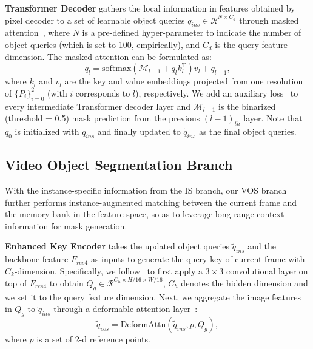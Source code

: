 \documentclass[10pt,twocolumn,letterpaper]{article}
\begin{document}
\vspace{0.02in}
\noindent \textbf{Transformer Decoder} gathers the local information in features obtained by pixel decoder to a set of learnable object queries $q_{ins} \in \mathcal{R}^{N \times C_{d}}$ through masked attention~\cite{cheng2022masked}, where $N$ is a pre-defined hyper-parameter to indicate the number of object queries (which is set to 100, empirically), and $C_{d}$ is the query feature dimension. The masked attention can be formulated as:
\begin{equation}
    q_{l} = \mathrm{softmax}(\mathcal{M}_{l-1} + q_{l}k_{l}^{\mathrm{T}})v_{l} + q_{l-1},
\end{equation}
where $k_{l}$ and $v_{l}$ are the key and value embeddings projected from one resolution of $\{P_{i}\}_{i=0}^{2}$ (with $i$ corresponds to $l$), respectively. We add an auxiliary loss~\cite{cheng2022masked} to every intermediate Transformer decoder layer and $\mathcal{M}_{l-1}$ is the binarized (threshold = 0.5) mask prediction from the previous $(l-1)_{th}$ layer. Note that $q_{0}$ is initialized with $q_{ins}$ and finally updated to $\tilde{q}_{ins}$ as the final object queries.


\subsection{Video Object Segmentation Branch}
\label{subsec:vos_branch}
With the instance-specific information from the IS branch, our VOS branch further performs instance-augmented matching between the current frame and the memory bank in the feature space, so as to leverage long-range context information for mask generation. 

\vspace{0.02in}
\noindent \textbf{Enhanced Key Encoder} takes the updated object queries $\tilde{q}_{ins}$ and the backbone feature $F_{res4}$ as inputs to generate the query key of current frame with $C_{k}$-dimension. Specifically, we follow~\cite{cheng2021stcn} to first apply a $3\times3$ convolutional layer on top of $F_{res4}$ to obtain $Q_{g} \in \mathcal{R}^{C_{h} \times H/16 \times W/16}$, $C_{h}$ denotes the hidden dimension and we set it to the query feature dimension. Next, we aggregate the image features in $Q_{g}$ to $\tilde{q}_{ins}$ through a deformable attention layer~\cite{zhu2021deformable}:
\begin{equation}
    \tilde{q}_{vos} = \mathrm{DeformAttn}(\tilde{q}_{ins}, p, Q_{g}),
    \label{formulation:qe}
\end{equation}
where $p$ is a set of 2-d reference points. 
\end{document}
